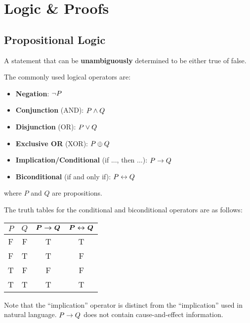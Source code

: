 \section{Logic \& Proofs}

\subsection{Propositional Logic}

\begin{definition}[Proposition]
    A statement that can be \textbf{unambiguously} determined to be either true of false.
\end{definition}

\begin{definition}
    The commonly used logical operators are:
    \begin{itemize}
        \item \textbf{Negation}: $\neg P$
        \item \textbf{Conjunction} (AND): $P \wedge Q$
        \item \textbf{Disjunction} (OR): $P \vee Q$
        \item \textbf{Exclusive OR} (XOR): $P \oplus Q$
        \item \textbf{Implication/Conditional} (if ..., then ...): $P \rightarrow Q$
        \item \textbf{Biconditional} (if and only if): $P \leftrightarrow Q$
    \end{itemize}
    where $P$ and $Q$ are propositions.
\end{definition}

\begin{remark}
    The truth tables for the conditional and biconditional operators are as follows:
    \begin{table}[H]
        \centering
        \begin{tabular}{cccc}
            $P$ & $Q$ & $\boldsymbol{P \rightarrow Q}$ & $\boldsymbol{P \leftrightarrow Q}$ \\ \hline
            F   & F   & T                     & T                     \\
            F   & T   & T                     & F                     \\
            T   & F   & F                     & F                     \\
            T   & T   & T                     & T                     \\
        \end{tabular}
    \end{table}

    Note that the ``implication'' operator is distinct from the ``implication'' used in natural
    language. $P \rightarrow Q$ does not contain cause-and-effect information.
\end{remark}

